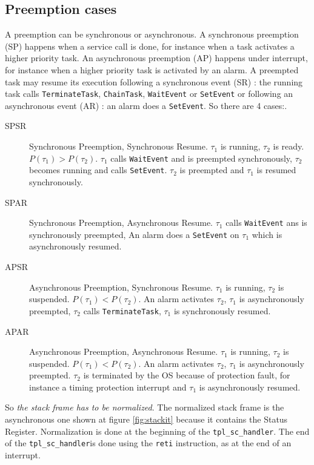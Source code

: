 \documentclass[11pt, oneside]{article}   	%
\newcommand{\sch}{\lstinline{tpl_sc_handler}}
\begin{document}
\subsection*{Preemption cases}

A preemption can be synchronous or asynchronous. A synchronous preemption (SP) happens when a service call is done, for instance when a task activates a higher priority task. An asynchronous preemption (AP) happens under interrupt, for instance when a higher priority task is activated by an alarm. A preempted task may resume its execution following a synchronous event (SR) : the running task calls \lstinline{TerminateTask}, \lstinline{ChainTask}, \lstinline{WaitEvent} or \lstinline{SetEvent} or following an asynchronous event (AR) : an alarm does a \lstinline{SetEvent}. So there are 4 cases:.

\begin{description}

\item[SPSR] Synchronous Preemption, Synchronous Resume. $\tau_1$ is running, $\tau_2$ is ready. $P(\tau_1) > P(\tau_2)$.
$\tau_1$ calls \lstinline{WaitEvent} and is preempted synchronously, $\tau_2$ becomes running and  calls \lstinline{SetEvent}. $\tau_2$ is preempted and $\tau_1$ is resumed synchronously.

\item[SPAR] Synchronous Preemption, Asynchronous Resume. $\tau_1$ calls \lstinline{WaitEvent} ans is synchronously preempted, An alarm does a \lstinline{SetEvent} on $\tau_1$ which is asynchronously resumed.

\item[APSR] Asynchronous Preemption, Synchronous Resume. $\tau_1$ is running, $\tau_2$ is suspended. $P(\tau_1) < P(\tau_2)$. An alarm activates $\tau_2$, $\tau_1$ is asynchronously preempted, $\tau_2$ calls \lstinline{TerminateTask}, $\tau_1$ is synchronously resumed.

\item[APAR] Asynchronous Preemption, Asynchronous Resume. $\tau_1$ is running, $\tau_2$ is suspended. $P(\tau_1) < P(\tau_2)$. An alarm activates $\tau_2$, $\tau_1$ is asynchronously preempted. $\tau_2$ is terminated by the OS because of protection fault, for instance a timing protection interrupt and $\tau_1$ is asynchronously resumed.

\end{description}

So \emph{the stack frame has to be normalized}. The normalized stack frame is the asynchronous one shown at figure \ref{fig:stackit} because it contains the Status Register. Normalization is done at the beginning of the \sch. The end of the \sch is done using the \texttt{reti} instruction, as at the end of an interrupt.
\end{document}
